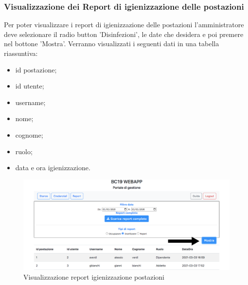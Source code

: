 \subsubsection{Visualizzazione dei Report di igienizzazione delle postazioni}
Per poter visualizzare i report di igienizzazione delle postazioni l'amministratore deve selezionare il radio button 'Disinfezioni', le date che desidera e poi premere nel bottone 'Mostra'.
Verranno visualizzati i seguenti dati in una tabella riassuntiva:
\begin{itemize}
\item id postazione;
\item id utente;
\item username;
\item nome;
\item cognome;
\item ruolo;
\item data e ora igienizzazione.
\end{itemize}
\begin{figure}[H]
	\centering
	\includegraphics[width=15cm]{res/images/bottoneReportI.png}
	\caption{Visualizzazione report igienizzazione postazioni}
\end{figure}

